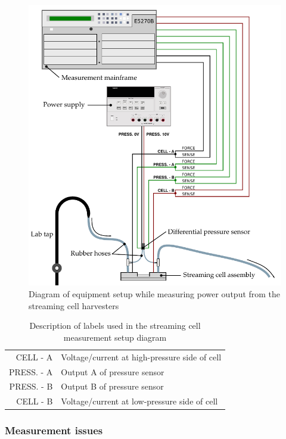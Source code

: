     \begin{figure}
        \includegraphics{content/pt1/01-PowerHarvesting/graphics/measurementSetup}
        \caption{\label{fig:measurementSetup}Diagram of equipment setup while measuring power output from the streaming cell harvesters}
    \end{figure}

    \begin{table}
        \centering
        \begin{tabular}{r|l}
        CELL - A & Voltage/current at high-pressure side of cell\\
        PRESS. - A & Output A of pressure sensor\\
        PRESS. - B & Output B of pressure sensor\\
        CELL - B & Voltage/current at low-pressure side of cell
        \end{tabular}
        \caption{\label{tab:measurementSetup_legend}Description of labels used in the streaming cell measurement setup diagram}
    \end{table}


    \subsubsection*{Measurement issues}


